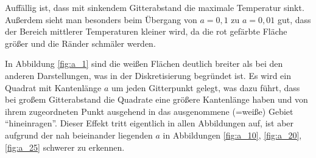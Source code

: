 \documentclass[10pt,a4paper]{article}
\begin{document}
Auffällig ist, dass mit sinkendem Gitterabstand die maximale Temperatur sinkt. Außerdem sieht man besonders beim Übergang von $a=0,1$  zu $a=0,01$ gut, dass der Bereich mittlerer Temperaturen kleiner wird, da die rot gefärbte Fläche größer und die Ränder schmäler werden.

In Abbildung \ref{fig:a_1} sind die weißen Flächen deutlich breiter als bei den anderen Darstellungen, was in der Diskretisierung begründet ist. Es wird ein Quadrat mit Kantenlänge $a$ um jeden Gitterpunkt gelegt, was dazu führt, dass bei großem Gitterabstand die Quadrate eine größere Kantenlänge haben und von ihrem zugeordneten Punkt ausgehend in das ausgenommene (=weiße) Gebiet "`hineinragen"'. Dieser Effekt tritt eigentlich in allen Abbildungen auf, ist aber aufgrund der nah beieinander liegenden $a$ in Abbildungen \ref{fig:a_10}, \ref{fig:a_20}, \ref{fig:a_25} schwerer zu erkennen.
\end{document}
